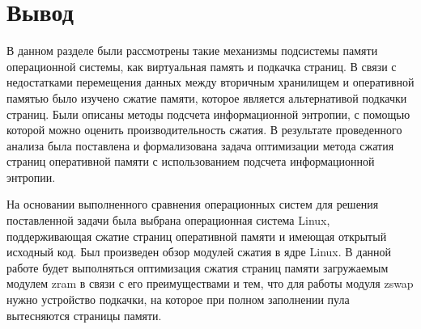 \section*{Вывод}

В данном разделе были рассмотрены такие механизмы подсистемы памяти операционной системы, как виртуальная память и подкачка страниц. В связи с недостатками перемещения данных между вторичным хранилищем и оперативной памятью было изучено сжатие памяти, которое является альтернативой подкачки страниц. Были описаны методы подсчета информационной энтропии, с помощью которой можно оценить производительность сжатия. В результате проведенного анализа была поставлена и формализована задача оптимизации метода сжатия страниц оперативной памяти с использованием подсчета информационной энтропии.

На основании выполненного сравнения операционных систем для решения поставленной задачи была выбрана операционная система Linux, поддерживающая сжатие страниц оперативной памяти и имеющая открытый исходный код. Был произведен обзор модулей сжатия в ядре Linux. В данной работе будет выполняться оптимизация сжатия страниц памяти загружаемым модулем zram в связи с его преимуществами и тем, что для работы модуля zswap нужно устройство подкачки, на которое при полном заполнении пула вытесняются страницы памяти.
